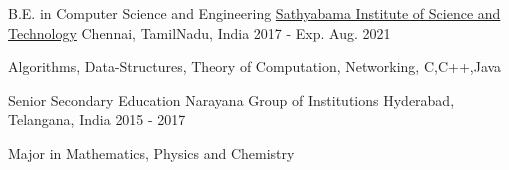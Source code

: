 

\begin{cventries}

  \cventry
    {B.E. in Computer Science and Engineering} %
    {\href{http://www.sathyabama.ac.in}{Sathyabama Institute of Science and Technology}} %
    {Chennai, TamilNadu, India} %
    {2017 - Exp. Aug. 2021} %
    {
      \begin{cvitems} %
        \item {Algorithms, Data-Structures, Theory of Computation, Networking, C,C++,Java}
      \end{cvitems}
    }

  \cventry
    {Senior Secondary Education} %
    {Narayana Group of Institutions} %
    {Hyderabad, Telangana, India} %
    {2015 - 2017} %
    {
      \begin{cvitems} %
        \item {Major in Mathematics, Physics and Chemistry}
      \end{cvitems}
    }

\end{cventries}
